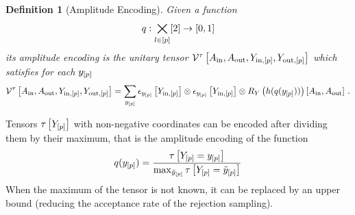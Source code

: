 \documentclass[aps,onecolumn,nofootinbib,pra]{article}
\newtheorem{definition}{Definition}
\begin{document}
    \begin{definition}[Amplitude Encoding]
        Given a function
        \begin{align*}
            q : \bigtimes_{l\in[p]} [2] \rightarrow [0,1]
        \end{align*}
        its amplitude encoding is the unitary tensor
        $\mathcal{V}^{\tau}\left[A_{\mathrm{in}},A_{\mathrm{out}},Y_{\mathrm{in},[p]},Y_{\mathrm{out},[p]}\right]$ which satisfies for each $y_{[p]}$
        \begin{align*}
            \mathcal{V}^{\tau}\left[A_{\mathrm{in}},A_{\mathrm{out}},Y_{\mathrm{in},[p]},Y_{\mathrm{out},[p]}\right]
            = \sum_{y_{[p]}} \epsilon_{y_{[p]}}\left[Y_{\mathrm{in},[p]}\right]
            \otimes \epsilon_{y_{[p]}}\left[Y_{\mathrm{in},[p]}\right]
            \otimes R_Y\left({h(q(y_{[p]}))}\right)\left[A_{\mathrm{in}},A_{\mathrm{out}}\right] \, .
        \end{align*}
    \end{definition}




    Tensors $\tau\left[Y_{[p]}\right]$ with non-negative coordinates can be encoded after dividing them by their maximum, that is the amplitude encoding of the function
    \begin{align*}
        q(y_{[p]}) = \frac{\tau\left[Y_{[p]}=y_{[p]}\right]}{\max_{\tilde{y}_{[p]}} \tau\left[Y_{[p]}=\tilde{y}_{[p]}\right]}
    \end{align*}
    When the maximum of the tensor is not known, it can be replaced by an upper bound (reducing the acceptance rate of the rejection sampling).
\end{document}
